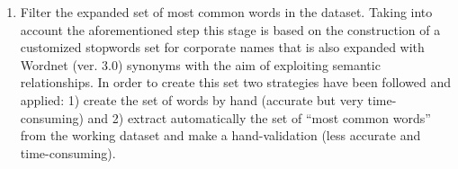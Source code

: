\documentclass{llncs}
\begin{document}
\begin{enumerate}
%  

\item Filter the expanded set of most common words in the dataset. Taking into account 
the aforementioned step this stage is based on the construction of a customized stopwords 
set for corporate names that is also expanded with Wordnet (ver. 3.0) synonyms with the aim of 
exploiting semantic relationships. In order to create this set two strategies have been followed and applied: 1) create the set 
of words by hand (accurate but very time-consuming) and 2) extract automatically the set of ``most common words'' from the 
working dataset and make a hand-validation (less accurate and time-consuming). 
    
%
%


\end{enumerate}
\end{document}
